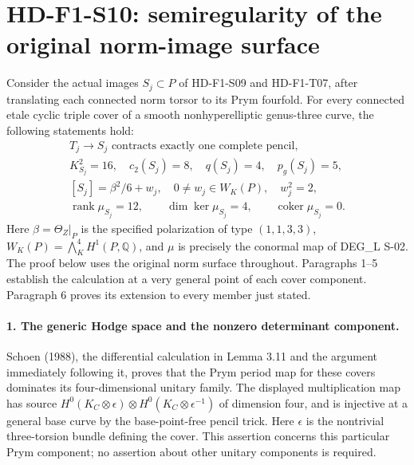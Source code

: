 
\section{HD-F1-S10: semiregularity of the original norm-image surface}
\label{sec:f1-norm-image-semiregularity}

Consider the actual images $S_j\subset P$ of HD-F1-S09 and HD-F1-T07,
after translating each connected norm torsor to its Prym fourfold.
For every connected etale cyclic triple cover of a smooth
nonhyperelliptic genus-three curve, the following statements hold:
\[
 \begin{gathered}
 T_j\longrightarrow S_j\text{ contracts exactly one complete pencil},\\
 K_{S_j}^2=16,\quad c_2(S_j)=8,\quad q(S_j)=4,\quad p_g(S_j)=5,\\
 [S_j]=\beta^2/6+w_j,\quad 0\ne w_j\in W_K(P),\quad w_j^2=2,\\
 \operatorname{rank}\mu_{S_j}=12,\qquad
 \dim\ker\mu_{S_j}=4,\qquad\operatorname{coker}\mu_{S_j}=0.
 \end{gathered}
 \tag{F1S10.1}
\]
Here $\beta=\Theta_Z|_P$ is the specified polarization of type
$(1,1,3,3)$, $W_K(P)=\bigwedge_K^4 H^1(P,\mathbb Q)$, and
$\mu$ is precisely the conormal map of DEG\_L S-02.
The proof below uses the original norm surface throughout. Paragraphs
1--5 establish the calculation at a very general point of each cover
component. Paragraph 6 proves its extension to every member just stated.

\paragraph{1. The generic Hodge space and the nonzero determinant component.}
Schoen (1988), the differential calculation in Lemma 3.11 and the
argument immediately following it, proves that the Prym period map
for these covers dominates its four-dimensional unitary family.
The displayed multiplication map has source
$H^0(K_C\otimes\epsilon)\otimes H^0(K_C\otimes\epsilon^{-1})$
of dimension four, and is injective at a general base curve by the
base-point-free pencil trick. Here $\epsilon$ is the nontrivial
three-torsion bundle defining the cover. This assertion concerns
this particular Prym component; no assertion about other unitary
components is required.

